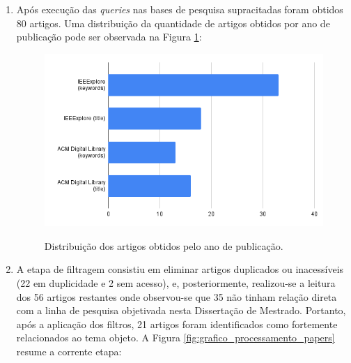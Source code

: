 \begin{enumerate}
    \item Após execução das \textit{queries} nas bases de pesquisa supracitadas foram obtidos 80 artigos. Uma distribuição da quantidade de artigos obtidos por ano de publicação pode ser observada na Figura \ref{fig:grafico_num_papers}:
      \begin{figure}[H]
    \centering
    \caption{Distribuição dos artigos obtidos pelo ano de publicação.} \includegraphics[width=12cm,height=\textwidth,keepaspectratio]{2-images/artigos-bars-horizontal.png}
    \newline {}\label{fig:grafico_num_papers}
    \end{figure}
    \item A etapa de filtragem consistiu em eliminar artigos duplicados ou inacessíveis (22 em duplicidade e 2 sem acesso), e, posteriormente, realizou-se a leitura dos 56 artigos restantes onde observou-se que 35 não tinham relação direta com a linha de pesquisa objetivada nesta Dissertação de Mestrado. Portanto, após a aplicação dos filtros, 21 artigos foram identificados como fortemente relacionados ao tema objeto. A Figura \ref{fig:grafico_processamento_papers} resume a corrente etapa:
    

\end{enumerate}
